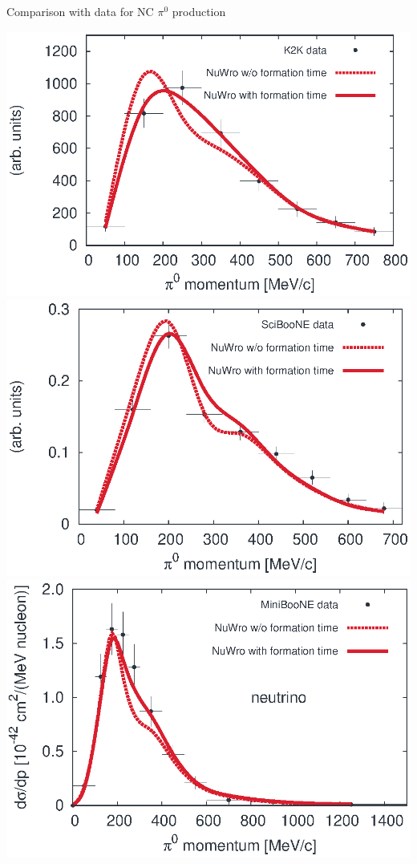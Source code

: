 \begin{wideslide}[toc=]{Comparison with data for NC $\pi^0$ production}
 
  \hspace{20pt}\includegraphics[width = 0.425\slidewidth]{img/k2k.eps}
  \includegraphics[width = 0.425\slidewidth]{img/sb.eps}\\
  \hspace{20pt}\includegraphics[width = 0.425\slidewidth]{img/mb.eps}

\end{wideslide}
